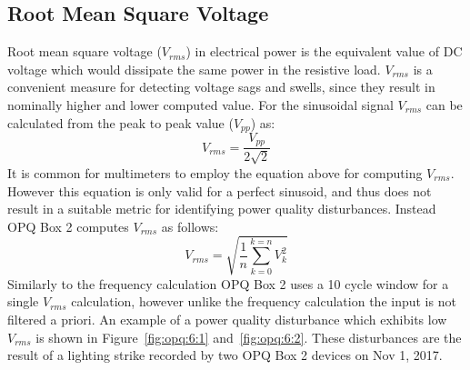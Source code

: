 \subsection{Root Mean Square Voltage}\label{subsec:root-mean-square-voltage}

Root mean square voltage ($V_{rms}$) in electrical power is the equivalent value of DC voltage which would dissipate the same power in the resistive load. $V_{rms}$ is a convenient measure for detecting voltage sags and swells, since they result in nominally higher and lower computed value.
For the sinusoidal signal $V_{rms}$ can be calculated from the peak to peak value ($V_{pp}$) as:
\begin{equation} \label{eq:2}
	V_{rms} = \frac{V_{pp}}{2\sqrt{2}}
\end{equation}
It is common for multimeters to employ the equation above for computing $V_{rms}$.
However this equation is only valid for a perfect sinusoid, and thus does not result in a suitable metric for identifying power quality disturbances.
Instead OPQ Box 2 computes $V_{rms}$ as follows:
\begin{equation} \label{eq:3}
	V_{rms} = \sqrt{\frac{1}{n}\sum\limits_{k=0}^{k=n}V_{k}^{2}}
\end{equation}
Similarly to the frequency calculation OPQ Box 2 uses a 10 cycle window for a single $V_{rms}$ calculation, however unlike the frequency calculation the input is not filtered a priori.
An example of a power quality disturbance which exhibits low $V_{rms}$ is shown in Figure~\ref{fig:opq:6:1} and~\ref{fig:opq:6:2}.
These disturbances are the result of a lighting strike recorded by two OPQ Box 2 devices on Nov 1, 2017.


